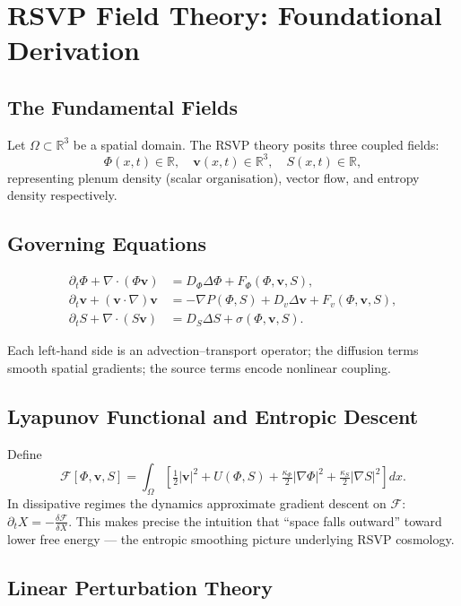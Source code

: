 \documentclass[11pt, openany]{book}
\theoremstyle{plain}
\theoremstyle{definition}
\theoremstyle{remark}
\newcommand{\R}{\mathbb{R}}
\begin{document}
\chapter{RSVP Field Theory: Foundational Derivation}

\section{The Fundamental Fields}

Let $\Omega\subset\R^3$ be a spatial domain. The RSVP theory posits three
coupled fields:
\[
  \Phi(x,t)\in\R,\quad
  \mathbf{v}(x,t)\in\R^3,\quad
  S(x,t)\in\R,
\]
representing plenum density (scalar organisation), vector flow, and entropy
density respectively.

\section{Governing Equations}

\begin{align}
  \partial_t\Phi+\nabla\cdot(\Phi\mathbf{v})
    &= D_\Phi\Delta\Phi+F_\Phi(\Phi,\mathbf{v},S), \tag{A}\\
  \partial_t\mathbf{v}+(\mathbf{v}\cdot\nabla)\mathbf{v}
    &= -\nabla P(\Phi,S)+D_v\Delta\mathbf{v}+F_v(\Phi,\mathbf{v},S), \tag{B}\\
  \partial_t S+\nabla\cdot(S\mathbf{v})
    &= D_S\Delta S+\sigma(\Phi,\mathbf{v},S). \tag{C}
\end{align}

Each left-hand side is an advection--transport operator; the diffusion terms
smooth spatial gradients; the source terms encode nonlinear coupling.

\section{Lyapunov Functional and Entropic Descent}

Define
\[
  \mathcal{F}[\Phi,\mathbf{v},S]
  =\int_\Omega\!\left[
    \tfrac12|\mathbf{v}|^2
    +U(\Phi,S)
    +\tfrac{\kappa_\Phi}{2}|\nabla\Phi|^2
    +\tfrac{\kappa_S}{2}|\nabla S|^2
  \right]dx.
\]
In dissipative regimes the dynamics approximate gradient descent on
$\mathcal{F}$:
$\partial_t X = -\frac{\delta\mathcal{F}}{\delta X}$.
This makes precise the intuition that ``space falls outward'' toward lower
free energy --- the entropic smoothing picture underlying RSVP cosmology.

\section{Linear Perturbation Theory}
\end{document}
